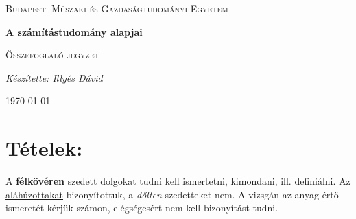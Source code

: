 \documentclass[10pt]{article}
\begin{document}
\begin{titlepage}
	\centering \vfill
	{\textsc{Budapesti Műszaki és Gazdaságtudományi Egyetem} \par} \vspace{7cm}
	{\huge\bfseries A számítástudomány alapjai\par} \vspace{0.5cm}
	{\large \textsc{Összefoglaló jegyzet}\par} \vspace{1.5cm}
	{\Large\itshape Készítette: Illyés Dávid\par} \vfill

	\noindent{}
	
	\vfill {\large \today\par}
\end{titlepage} 
\tableofcontents
{}

    \section*{Tételek:}

        A \textbf{félkövéren} szedett dolgokat tudni kell ismertetni, kimondani, ill. definiálni. Az \underline{aláhúzottakat} bizonyítottuk, a \textit{dőlten} szedetteket nem. A vizsgán az anyag értő ismeretét kérjük számon, elégségesért nem kell bizonyítást tudni.
\end{document}
